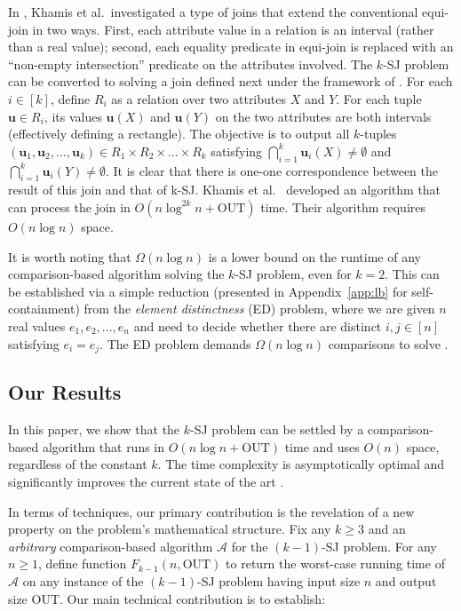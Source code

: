 \documentclass[sigconf]{acmart}
\def\vgap{\vspace{0mm}}
\def\A{\mathcal{A}}
\def\out{\mathrm{OUT}}
\begin{document}
\vgap

In \cite{kcko22}, Khamis et al.\ investigated a type of joins that extend the conventional equi-join in two ways. First, each attribute value in a relation is an interval (rather than a real value); second, each equality predicate in equi-join is replaced with an ``non-empty intersection'' predicate on the attributes involved. The $k$-SJ problem can be converted to solving a join defined next under the framework of \cite{kcko22}. For each $i \in [k]$, define $R_i$ as a relation over two attributes $X$ and $Y$. For each tuple $\bm{u} \in R_i$, its values $\bm{u}(X)$ and $\bm{u}(Y)$ on the two attributes are both intervals (effectively defining a rectangle). The objective is to output all $k$-tuples $(\bm{u}_1, \bm{u}_2, ..., \bm{u}_k) \in R_1 \times R_2 \times ... \times R_k$ satisfying $\bigcap_{i=1}^k \bm{u}_i(X) \ne \emptyset$ and $\bigcap_{i=1}^k \bm{u}_i(Y) \ne \emptyset$. It is clear that there is one-one correspondence between the result of this join and that of k-SJ. Khamis et al.\ \cite{kcko22} developed an algorithm that can process the join  in $O(n \log^{2k} n + \out)$ time. Their algorithm requires $O(n \log n)$ space.

\vgap 

It is worth noting that $\Omega(n \log n)$ is a lower bound on the runtime of any comparison-based algorithm solving the $k$-SJ problem, even for $k = 2$. This can be established via a simple reduction (presented in Appendix~\ref{app:lb} for self-containment) from the {\em element distinctness} (ED) problem, where we are given $n$ real values $e_1, e_2, ..., e_n$ and need to decide whether there are distinct $i, j \in [n]$ satisfying $e_i = e_j$. The ED problem demands $\Omega(n \log n)$ comparisons to solve \cite{dl79}.  


\subsection{Our Results} \label{sec:intro:ours} 

In this paper, we show that the $k$-SJ problem can be settled by a comparison-based algorithm that runs in $O(n \log n + \out)$ time and uses  $O(n)$ space, regardless of the constant $k$. The time complexity is asymptotically optimal and significantly improves the current state of the art \cite{kcko22}.

\vgap 

In terms of techniques, our primary contribution is the revelation of a new property on the problem's mathematical structure. Fix any $k \ge 3$ and an {\em arbitrary} comparison-based algorithm $\A$ for the $(k-1)$-SJ problem. For any $n \ge 1$, define function $F_{k-1}(n, \out)$ to return the worst-case running time of $\A$ on any instance of the $(k-1)$-SJ problem having input size $n$ and output size $\out$. Our main technical contribution is to establish: 
\end{document}
